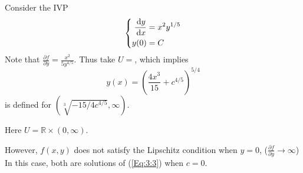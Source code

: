 \begin{example}
Consider the IVP
\[
\left\{
\begin{aligned}
\frac{\,\mathrm{d} y}{\,\mathrm{d} x}&=x^2y^{1/5}\\
y(0)&=C
\end{aligned}
\right.
\]
Note that $\frac{\partial f}{\partial y}=\frac{x^2}{5y^{4/5}}$. Thus take $U=$, which implies
\[
y(x)=\left(\frac{4x^3}{15}+c^{4/5}\right)^{5/4}
\]
is defined for $(\sqrt[3]{-15/4c^{4/5}},\infty)$.

Here $U=\mathbb{R}\times(0,\infty)$.

However, $f(x,y)$ does not satisfy the Lipschitz condition when $y=0$, ($\frac{\partial f}{\partial y}\to\infty$)
In this case, both are solutions of (\ref{Eq:3:3}) when $c=0$.
\end{example}

























